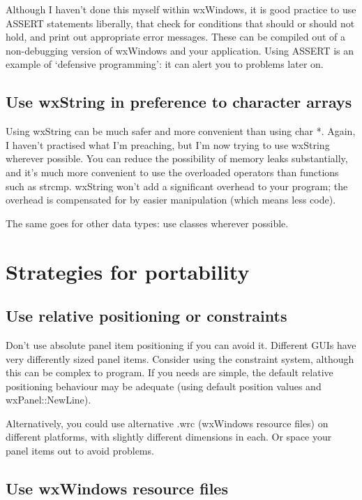 Although I haven't done this myself within wxWindows, it is good
practice to use ASSERT statements liberally, that check for conditions that
should or should not hold, and print out appropriate error messages.
These can be compiled out of a non-debugging version of wxWindows
and your application. Using ASSERT is an example of `defensive programming':
it can alert you to problems later on.

\subsection{Use wxString in preference to character arrays}

Using wxString can be much safer and more convenient than using char *.
Again, I haven't practised what I'm preaching, but I'm now trying to use
wxString wherever possible. You can reduce the possibility of memory
leaks substantially, and it's much more convenient to use the overloaded
operators than functions such as strcmp. wxString won't add a significant
overhead to your program; the overhead is compensated for by easier
manipulation (which means less code).

The same goes for other data types: use classes wherever possible.

\section{Strategies for portability}

\subsection{Use relative positioning or constraints}

Don't use absolute panel item positioning if you can avoid it. Different GUIs have
very differently sized panel items. Consider using the constraint system, although this
can be complex to program. If you needs are simple, the default relative positioning
behaviour may be adequate (using default position values and wxPanel::NewLine).

Alternatively, you could use alternative .wrc (wxWindows resource files) on different
platforms, with slightly different dimensions in each. Or space your panel items out
to avoid problems.

\subsection{Use wxWindows resource files}

